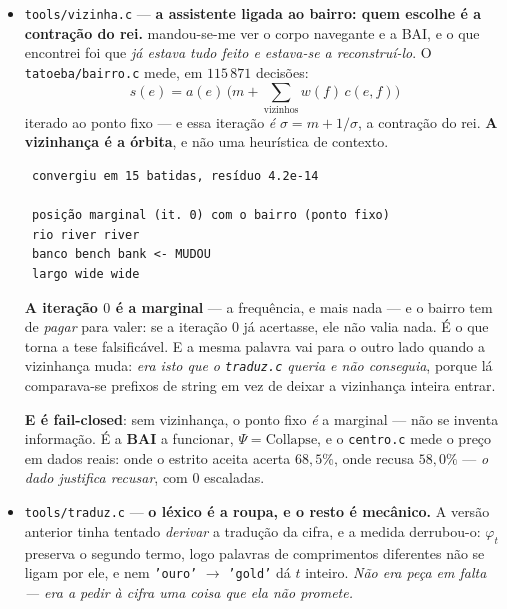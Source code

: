 \documentclass[11pt]{article}
\newcommand{\code}[1]{\texttt{\small #1}}
\theoremstyle{plain}
\theoremstyle{remark}
\begin{document}
\begin{itemize}
\begin{verbatim}
 fio na "indução" -> "o corpo áureo, e a indução tem essa cifra"
 fio no "relógio" -> "o que manda no relógio da rede"
\end{verbatim}

\textbf{ficava com a mais funda, e isso era ficar na iteração $0$.} A profundidade é a
\emph{marginal} --- aqui as duas candidatas têm $15$, e ela não separa. Quem separa é a vizinhança,
e a escolha é o ponto fixo de $s(e) = a(e)(m+\sum w(f)c(e,f))$. \emph{Sem contexto fica a marginal}
--- fail-closed, e não se inventa.

\item \code{tools/vizinha.c} --- \textbf{a assistente ligada ao bairro: quem escolhe é a
contração do rei.} mandou-se-me ver o corpo navegante e a BAI, e o que encontrei foi que
\emph{já estava tudo feito e estava-se a reconstruí-lo}. O \code{tatoeba/bairro.c} mede, em
$115\,871$ decisões:
\[ s(e) = a(e)\,\bigl(m + \textstyle\sum_{\text{vizinhos}} w(f)\,c(e,f) \bigr) \]
iterado ao ponto fixo --- e essa iteração \emph{é} $\sigma = m + 1/\sigma$, a contração do rei. \textbf{A
vizinhança é a órbita}, e não uma heurística de contexto.

\begin{verbatim}
 convergiu em 15 batidas, resíduo 4.2e-14

 posição marginal (it. 0) com o bairro (ponto fixo)
 rio river river
 banco bench bank <- MUDOU
 largo wide wide
\end{verbatim}

\textbf{A iteração $0$ é a marginal} --- a frequência, e mais nada --- e o bairro tem de
\emph{pagar} para valer: se a iteração $0$ já acertasse, ele não valia nada. É o que torna a tese
falsificável. E a mesma palavra vai para o outro lado quando a vizinhança muda: \emph{era isto que
o \code{traduz.c} queria e não conseguia}, porque lá comparava-se prefixos de string em vez de
deixar a vizinhança inteira entrar.

\textbf{E é fail-closed}: sem vizinhança, o ponto fixo \emph{é} a marginal --- não se inventa
informação. É a \textbf{BAI} a funcionar, $\Psi = \mathrm{Collapse}$, e o \code{centro.c} mede o
preço em dados reais: onde o estrito aceita acerta $68{,}5\%$, onde recusa $58{,}0\%$ --- \emph{o
dado justifica recusar}, com $0$ escaladas.

\item \code{tools/traduz.c} --- \textbf{o léxico é a roupa, e o resto é mecânico.} A versão anterior tinha
tentado \emph{derivar} a tradução da cifra, e a medida derrubou-o: $\varphi_t$ preserva o segundo
termo, logo palavras de comprimentos diferentes não se ligam por ele, e nem \code{'ouro'} $\to$
\code{'gold'} dá $t$ inteiro. \emph{Não era peça em falta --- era a pedir à cifra uma coisa que
ela não promete.}


\end{itemize}
\end{document}
